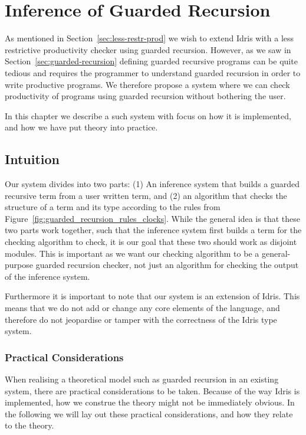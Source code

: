 \chapter{Inference of Guarded Recursion}
\label{cha:infer-guard-recurs}
As mentioned in Section~\ref{sec:less-restr-prod} we wish to extend Idris with
a less restrictive productivity checker using guarded recursion. However, as
we saw in Section~\ref{sec:guarded-recursion} defining guarded recursive
programs can be quite tedious and requires the programmer to understand guarded
recursion in order to write productive programs. We therefore propose a system
where we can check productivity of programs using guarded recursion without
bothering the user.

In this chapter we describe a such system with focus on how it is implemented,
and how we have put theory into practice.
\section{Intuition}
Our system divides into two parts: (1) An inference system that builds a
guarded recursive term from a user written term, and (2) an algorithm that
checks the structure of a term and its type according to the rules from 
Figure~\ref{fig:guarded_recursion_rules_clocks}. While the general idea is that
these two parts work together, such that the inference system first builds a term
for the checking algorithm to check, it is our goal that these two should work
as disjoint modules. This is important as we want our checking algorithm to be a
general-purpose guarded recursion checker, not just an algorithm for checking
the output of the inference system.

Furthermore it is important to note that our system is an extension of
Idris. This means that we do not add or change any core elements of the language, and
therefore do not jeopardise or tamper with the correctness of the Idris type system.

\subsection{Practical Considerations}
When realising a theoretical model such as guarded recursion in an existing
system, there are practical considerations to be taken. Because of the way Idris
is implemented, how we construe the theory might not be immediately obvious. In
the following we will lay out these practical considerations, and how they
relate to the theory.

